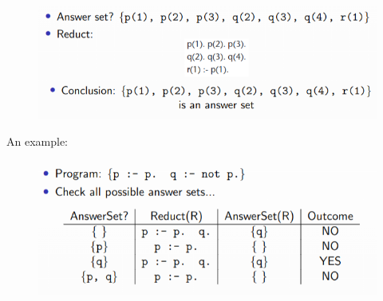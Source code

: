 \documentclass[10pt,a4paper]{report}
\begin{document}
\begin{itemize}
\begin{figure}[H]
    \end{figure}
    \begin{figure}[H]
        \centering
        \includegraphics[scale=0.5]{45.png}
    \end{figure}
\end{itemize}
An example:
\begin{figure}[H]
    \centering
    \includegraphics[scale=0.5]{46.png}
\end{figure}
\end{document}
